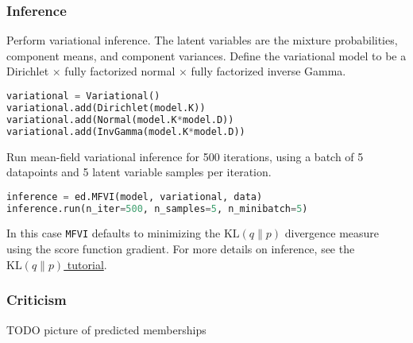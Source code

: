 \subsubsection{Inference}
Perform variational inference.
%
The latent variables are the mixture probabilities,
component means, and component variances.
Define the variational model to be a Dirichlet $\times$ fully factorized normal
$\times$ fully factorized inverse Gamma.
%
\begin{lstlisting}[language=Python]
variational = Variational()
variational.add(Dirichlet(model.K))
variational.add(Normal(model.K*model.D))
variational.add(InvGamma(model.K*model.D))
\end{lstlisting}

Run mean-field variational inference for 500 iterations, using a batch
of 5 datapoints and 5 latent variable samples per iteration.
\begin{lstlisting}[language=Python]
inference = ed.MFVI(model, variational, data)
inference.run(n_iter=500, n_samples=5, n_minibatch=5)
\end{lstlisting}
In this case
\texttt{MFVI} defaults to minimizing the
$\text{KL}(q\|p)$ divergence measure using the score function
gradient.
For more details on inference, see the \href{tut_KLqp.html}{$\text{KL}(q\|p)$ tutorial}.


\subsubsection{Criticism}

TODO picture of predicted memberships
